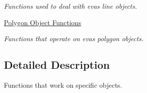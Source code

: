 \begin{DoxyCompactItemize}
\begin{DoxyCompactList}\small\item\em Functions used to deal with evas line objects. \item\end{DoxyCompactList}

\item 
\hyperlink{group__Evas__Object__Polygon}{Polygon Object Functions}


\begin{DoxyCompactList}\small\item\em Functions that operate on evas polygon objects. \item\end{DoxyCompactList}

\end{DoxyCompactItemize}


\subsection{Detailed Description}
Functions that work on specific objects. 